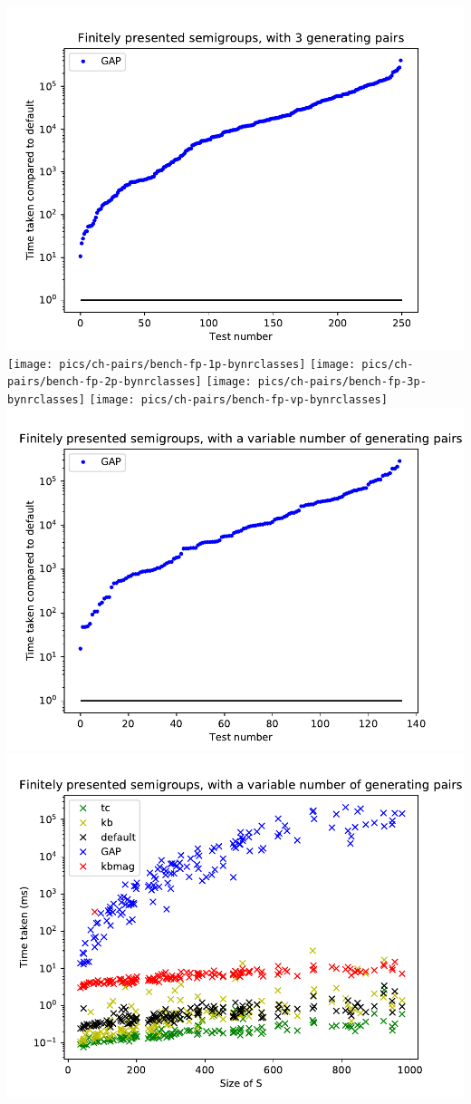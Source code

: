 \includegraphics[width=\textwidth]{pics/ch-pairs/bench-fp-3p-gap}
\texttt{[image: pics/ch-pairs/bench-fp-1p-bynrclasses]}
\texttt{[image: pics/ch-pairs/bench-fp-2p-bynrclasses]}
\texttt{[image: pics/ch-pairs/bench-fp-3p-bynrclasses]}
\texttt{[image: pics/ch-pairs/bench-fp-vp-bynrclasses]}
\includegraphics[width=\textwidth]{pics/ch-pairs/bench-fp-vp-gap}
\includegraphics[width=\textwidth]{pics/ch-pairs/bench-fp-vp-times}
